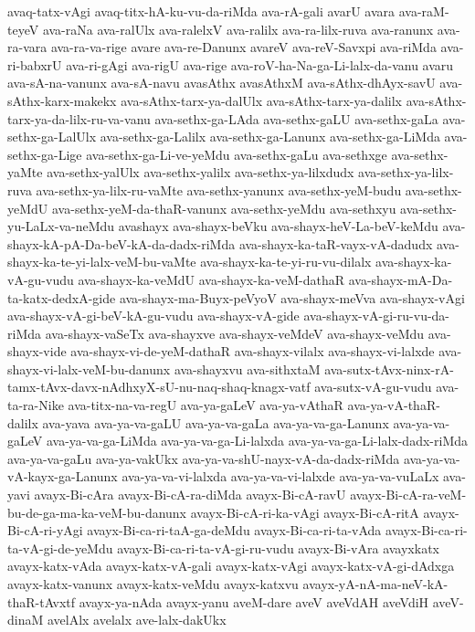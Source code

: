 {avaq-tatx-vAgi
avaq-titx-hA-ku-vu-da-riMda
ava-rA-gali
avarU
avara
ava-raM-teyeV
ava-raNa
ava-ralUlx
ava-ralelxV
ava-ralilx
ava-ra-lilx-ruva
ava-ranunx
ava-ra-vara
ava-ra-va-rige
avare
ava-re-Danunx
avareV
ava-reV-Savxpi
ava-riMda
ava-ri-babxrU
ava-ri-gAgi
ava-rigU
ava-rige
ava-roV-ha-Na-ga-Li-lalx-da-vanu
avaru
ava-sA-na-vanunx
ava-sA-navu
avasAthx
avasAthxM
ava-sAthx-dhAyx-savU
ava-sAthx-karx-makekx
ava-sAthx-tarx-ya-dalUlx
ava-sAthx-tarx-ya-dalilx
ava-sAthx-tarx-ya-da-lilx-ru-va-vanu
ava-sethx-ga-LAda
ava-sethx-gaLU
ava-sethx-gaLa
ava-sethx-ga-LalUlx
ava-sethx-ga-Lalilx
ava-sethx-ga-Lanunx
ava-sethx-ga-LiMda
ava-sethx-ga-Lige
ava-sethx-ga-Li-ve-yeMdu
ava-sethx-gaLu
ava-sethxge
ava-sethx-yaMte
ava-sethx-yalUlx
ava-sethx-yalilx
ava-sethx-ya-lilxdudx
ava-sethx-ya-lilx-ruva
ava-sethx-ya-lilx-ru-vaMte
ava-sethx-yanunx
ava-sethx-yeM-budu
ava-sethx-yeMdU
ava-sethx-yeM-da-thaR-vanunx
ava-sethx-yeMdu
ava-sethxyu
ava-sethx-yu-LaLx-va-neMdu
avashayx
ava-shayx-beVku
ava-shayx-heV-La-beV-keMdu
ava-shayx-kA-pA-Da-beV-kA-da-dadx-riMda
ava-shayx-ka-taR-vayx-vA-dadudx
ava-shayx-ka-te-yi-lalx-veM-bu-vaMte
ava-shayx-ka-te-yi-ru-vu-dilalx
ava-shayx-ka-vA-gu-vudu
ava-shayx-ka-veMdU
ava-shayx-ka-veM-dathaR
ava-shayx-mA-Da-ta-katx-dedxA-gide
ava-shayx-ma-Buyx-peVyoV
ava-shayx-meVva
ava-shayx-vAgi
ava-shayx-vA-gi-beV-kA-gu-vudu
ava-shayx-vA-gide
ava-shayx-vA-gi-ru-vu-da-riMda
ava-shayx-vaSeTx
ava-shayxve
ava-shayx-veMdeV
ava-shayx-veMdu
ava-shayx-vide
ava-shayx-vi-de-yeM-dathaR
ava-shayx-vilalx
ava-shayx-vi-lalxde
ava-shayx-vi-lalx-veM-bu-danunx
ava-shayxvu
ava-sithxtaM
ava-sutx-tAvx-ninx-rA-tamx-tAvx-davx-nAdhxyX-sU-nu-naq-shaq-knagx-vatf
ava-sutx-vA-gu-vudu
ava-ta-ra-Nike
ava-titx-na-va-regU
ava-ya-gaLeV
ava-ya-vAthaR
ava-ya-vA-thaR-dalilx
ava-yava
ava-ya-va-gaLU
ava-ya-va-gaLa
ava-ya-va-ga-Lanunx
ava-ya-va-gaLeV
ava-ya-va-ga-LiMda
ava-ya-va-ga-Li-lalxda
ava-ya-va-ga-Li-lalx-dadx-riMda
ava-ya-va-gaLu
ava-ya-vakUkx
ava-ya-va-shU-nayx-vA-da-dadx-riMda
ava-ya-va-vA-kayx-ga-Lanunx
ava-ya-va-vi-lalxda
ava-ya-va-vi-lalxde
ava-ya-va-vuLaLx
ava-yavi
avayx-Bi-cAra
avayx-Bi-cA-ra-diMda
avayx-Bi-cA-ravU
avayx-Bi-cA-ra-veM-bu-de-ga-ma-ka-veM-bu-danunx
avayx-Bi-cA-ri-ka-vAgi
avayx-Bi-cA-ritA
avayx-Bi-cA-ri-yAgi
avayx-Bi-ca-ri-taA-ga-deMdu
avayx-Bi-ca-ri-ta-vAda
avayx-Bi-ca-ri-ta-vA-gi-de-yeMdu
avayx-Bi-ca-ri-ta-vA-gi-ru-vudu
avayx-Bi-vAra
avayxkatx
avayx-katx-vAda
avayx-katx-vA-gali
avayx-katx-vAgi
avayx-katx-vA-gi-dAdxga
avayx-katx-vanunx
avayx-katx-veMdu
avayx-katxvu
avayx-yA-nA-ma-neV-kA-thaR-tAvxtf
avayx-ya-nAda
avayx-yanu
aveM-dare
aveV
aveVdAH
aveVdiH
aveV-dinaM
avelAlx
avelalx
ave-lalx-dakUkx
}
